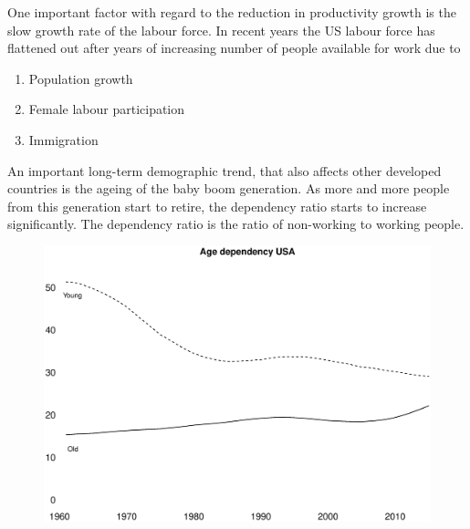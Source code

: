 \documentclass{beamer}
\begin{document}
\begin{frame}
One important factor with regard to the reduction in productivity growth is the slow growth rate of the labour force. 
In recent years the US labour force has flattened out after years of increasing number of people available for work due to
\begin{enumerate}
  \item Population growth
  \item Female labour participation
  \item Immigration
\end{enumerate}
\medskip
An important long-term demographic trend, that also affects other developed countries is the ageing of the baby boom generation. 
As more and more people from this generation start to retire, the dependency ratio starts to increase significantly.
The dependency ratio is the ratio of non-working to working people.  
\end{frame}

\begin{frame}
  \begin{figure}
    \includegraphics[scale=.3]{age_usa.eps}
  \end{figure}
\end{frame}
\end{document}
